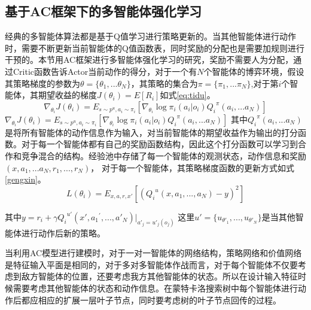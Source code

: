 \subsection{基于AC框架下的多智能体强化学习}
经典的多智能体算法都是基于Q值学习进行策略更新的。当其他智能体进行动作时，需要不断更新当前智能体的Q值函数表，同时奖励的分配也是需要加规则进行干预的。本节用AC框架进行多智能体强化学习的研究，奖励不需要人为分配，通过Critic函数告诉Actor当前动作的得分，对于一个有$N$个智能体的博弈环境，假设其策略梯度的参数为$\theta  = \{ {\theta _1},...{\theta _N}\} $，其策略的集合为$\pi  = \{ {\pi _1},...{\pi _N}\} $,对于第$i$个智能体，其期望收益的梯度$J({\theta _i}) = E[{R_i}]$如式\ref{eq:tidu}。
\begin{equation}
\label{eq:tidu}
{\nabla _{{\theta _i}}}J({\theta _i}) = {E_{s \sim {p^u},{a_i} \sim {\pi _i}}}[{\nabla _{{\theta _i}}}\log {\pi _i}({a_i}|{o_i}){Q_i}^\pi ({a_i},...{a_N})]
\end{equation}
${\nabla _{{\theta _i}}}J({\theta _i}) = {E_{s \sim {p^u},{a_i} \sim {\pi _i}}}[{\nabla _{{\theta _i}}}\log {\pi _i}({a_i}|{o_i}){Q_i}^\pi ({a_i},...{a_N})]$
其中${Q_i}^\pi ({a_i},...{a_N})$是将所有智能体的动作信息作为输入，对当前智能体的期望收益作为输出的打分函数。对于每一个智能体都有自己的奖励函数结构，因此这个打分函数可以学习到合作和竞争混合的结构。经验池中存储了每一个智能体的观测状态，动作信息和奖励$(x,{a_1},...{a_N},{r_1},...,{r_N})$，
对于每一个智能体，其策略梯度函数的更新方式如式\ref{gengxin}。
\begin{equation}
\label{gengxin}
L({\theta _i}) = {E_{x,a,r,x'}}[{({Q_i}^u(x,{a_1},...,{a_N}) - y)^2}]
\end{equation}

其中$y = {r_i} + \gamma {Q_i}^{u'}(x',{a_1}^\prime ,...,{a'_N}){|_{{{a'}_j} = {{u'}_j}({o_j})}}$
这里$u' = \{ {u_{{{\theta '}_1}}},...,{u_{{{\theta '}_N}}}\} $是当其他智能体进行动作后新的策略。

当利用AC模型进行建模时，对于一对一智能体的网络结构，策略网络和价值网络是特征输入平面是相同的，对于多对多智能体作战而言，对于每个智能体不仅要考虑到敌方智能体的位置，还要考虑我方其他智能体的状态。所以在设计输入特征时候需要考虑其他智能体的状态和动作信息。在蒙特卡洛搜索树中每个智能体进行动作后都应相应的扩展一层叶子节点，同时要考虑树的叶子节点回传的过程。
